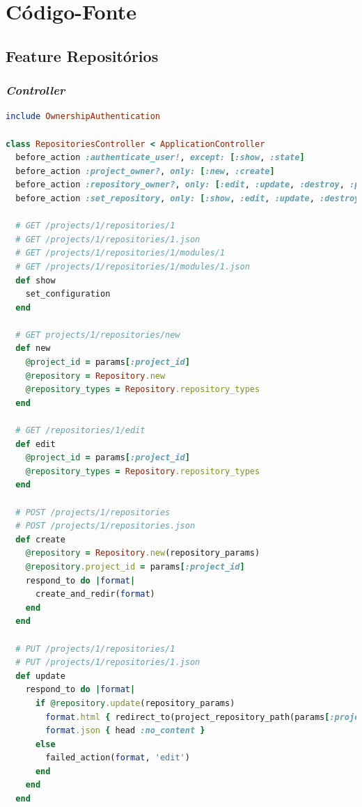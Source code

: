 \newpage
\section{Código-Fonte}
\label{source-code-appendix}

\subsection{Feature Repositórios}
\subsubsection{\textit{Controller}}
\begin{lstlisting}[language=Ruby]
include OwnershipAuthentication

class RepositoriesController < ApplicationController
  before_action :authenticate_user!, except: [:show, :state]
  before_action :project_owner?, only: [:new, :create]
  before_action :repository_owner?, only: [:edit, :update, :destroy, :process_repository]
  before_action :set_repository, only: [:show, :edit, :update, :destroy, :state, :process_repository]

  # GET /projects/1/repositories/1
  # GET /projects/1/repositories/1.json
  # GET /projects/1/repositories/1/modules/1
  # GET /projects/1/repositories/1/modules/1.json
  def show
    set_configuration
  end

  # GET projects/1/repositories/new
  def new
    @project_id = params[:project_id]
    @repository = Repository.new
    @repository_types = Repository.repository_types
  end

  # GET /repositories/1/edit
  def edit
    @project_id = params[:project_id]
    @repository_types = Repository.repository_types
  end

  # POST /projects/1/repositories
  # POST /projects/1/repositories.json
  def create
    @repository = Repository.new(repository_params)
    @repository.project_id = params[:project_id]
    respond_to do |format|
      create_and_redir(format)
    end
  end

  # PUT /projects/1/repositories/1
  # PUT /projects/1/repositories/1.json
  def update
    respond_to do |format|
      if @repository.update(repository_params)
        format.html { redirect_to(project_repository_path(params[:project_id], @repository.id), notice: 'Repository was successfully updated.') }
        format.json { head :no_content }
      else
        failed_action(format, 'edit')
      end
    end
  end


\end{lstlisting}

